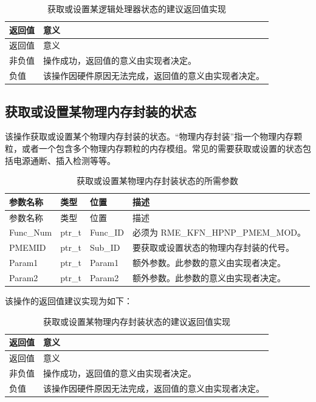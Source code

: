 \begin{xltabular}{\textwidth}{@{}>{\hsize\raggedright\arraybackslash}X>{\hsize\raggedright\arraybackslash}X@{}}
\caption{获取或设置某逻辑处理器状态的建议返回值实现}\label{tab:8-39-get-or-set-logical-processor-state-suggested-return-values}\\
\toprule
返回值 & 意义\tabularnewline
\endfirsthead
\toprule
返回值 & 意义\tabularnewline
\midrule
\endhead
\bottomrule
\endlastfoot
    非负值 & 操作成功，返回值的意义由实现者决定。\tabularnewline
    负值 & 该操作因硬件原因无法完成，返回值的意义由实现者决定。\tabularnewline
\end{xltabular}

\subsection{获取或设置某物理内存封装的状态}\label{subsec:8-get-or-set-physical-memory-package-state}

该操作获取或设置某个物理内存封装的状态。``物理内存封装''指一个物理内存颗粒，或者一个包含多个物理内存颗粒的内存模组。常见的需要获取或设置的状态包括电源通断、插入检测等等。

\begin{xltabular}{\textwidth}{@{}>{\hsize\raggedright\arraybackslash}X>{\hsize\raggedright\arraybackslash}X>{\hsize\raggedright\arraybackslash}X>{\hsize\raggedright\arraybackslash}X@{}}
\caption{获取或设置某物理内存封装状态的所需参数}\label{tab:8-40-get-or-set-physical-memory-package-state-parameters}\\
\toprule
参数名称 & 类型 & 位置 & 描述\tabularnewline
\endfirsthead
\toprule
参数名称 & 类型 & 位置 & 描述\tabularnewline
\midrule
\endhead
\bottomrule
\endlastfoot
Func\_Num & ptr\_t & Func\_ID & 必须为 RME\_KFN\_HPNP\_PMEM\_MOD。\tabularnewline
PMEMID & ptr\_t & Sub\_ID &
要获取或设置状态的物理内存封装的代号。\tabularnewline
Param1 & ptr\_t & Param1 &
额外参数。此参数的意义由实现者决定。\tabularnewline
Param2 & ptr\_t & Param2 &
额外参数。此参数的意义由实现者决定。\tabularnewline
\end{xltabular}

该操作的返回值建议实现为如下：

\begin{xltabular}{\textwidth}{@{}>{\hsize\raggedright\arraybackslash}X>{\hsize\raggedright\arraybackslash}X@{}}
\caption{获取或设置某物理内存封装状态的建议返回值实现}\label{tab:8-41-get-or-set-physical-memory-package-state-suggested-return-values}\\
\toprule
返回值 & 意义\tabularnewline
\endfirsthead
\toprule
返回值 & 意义\tabularnewline
\midrule
\endhead
\bottomrule
\endlastfoot
    非负值 & 操作成功，返回值的意义由实现者决定。\tabularnewline
    负值 & 该操作因硬件原因无法完成，返回值的意义由实现者决定。\tabularnewline
\end{xltabular}

